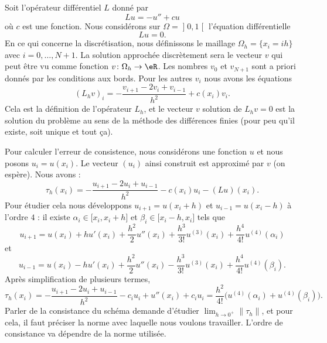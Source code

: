 Soit l'opérateur différentiel \( L\) donné par
\begin{equation}
    Lu=-u''+cu
\end{equation}
où \( c\) est une fonction. Nous considérons sur \( \Omega=\mathopen] 0 , 1 \mathclose[\) l'équation différentielle
\begin{equation}
    Lu=0.
\end{equation}
En ce qui concerne la discrétisation, nous définissons le maillage \( \Omega_h=\{x_i=ih\}\) avec \( i=0,\ldots, N+1\). La solution approchée discrètement sera le vecteur \( v\) qui peut être vu comme fonction \( v\colon \Omega_h\to \eR\). Les nombres \( v_0\) et \( v_{N+1}\) sont a priori donnés par les conditions aux bords. Pour les autres \( v_i\) nous avons les équations
\begin{equation}
    (L_hv)_i=-\frac{ v_{i+1}-2v_i+v_{i-1} }{ h^2 }+c(x_i)v_i.
\end{equation}
Cela est la définition de l'opérateur \( L_h\), et le vecteur \( v\) solution de \( L_hv=0\) est la solution du problème au sens de la méthode des différences finies (pour peu qu'il existe, soit unique et tout ça).

Pour calculer l'erreur de consistence, nous considérons une fonction \( u\) et nous posons \( u_i=u(x_i)\). Le vecteur \( (u_i)\) ainsi construit est approximé par \( v\) (on espère). Nous avons :
\begin{equation}
    \tau_h(x_i)=-\frac{ u_{i+1}-2u_i+u_{i-1} }{ h^2 }-c(x_i)u_i-(Lu)(x_i).
\end{equation}
Pour étudier cela nous développons \( u_{i+1}=u(x_i+h)\) et \( u_{i-1}=u(x_i-h)\) à l'ordre \( 4\) : il existe \( \alpha_i\in\mathopen[ x_i , x_i+h \mathclose]\) et \( \beta_i\in\mathopen[ x_i-h , x_i \mathclose]\) tels que
\begin{equation}
    u_{i+1}=u(x_i)+hu'(x_i)+\frac{ h^2 }{2}u''(x_i)+\frac{ h^3 }{ 3! }u^{(3)}(x_i)+\frac{ h^4 }{ 4! }u^{(4)}(\alpha_i)
\end{equation}
et
\begin{equation}
    u_{i-1}=u(x_i)-hu'(x_i)+\frac{ h^2 }{2}u''(x_i)-\frac{ h^3 }{ 3! }u^{(3)}(x_i)+\frac{ h^4 }{ 4! }u^{(4)}(\beta_i).
\end{equation}
Après simplification de plusieurs termes,
\begin{equation}
    \tau_h(x_i)=-\frac{ u_{i+1}-2u_i+u_{i-1} }{ h^2 }-c_iu_i+u''(x_i)+c_iu_i=\frac{ h^2 }{ 4! }\big( u^{(4)}(\alpha_i)+u^{(4)}(\beta_i) \big).
\end{equation}
Parler de la consistance du schéma demande d'étudier \( \lim_{h\to 0^+}\| \tau_h \| \), et pour cela, il faut préciser la norme avec laquelle nous voulons travailler. L'ordre de consistance va dépendre de la norme utilisée.

